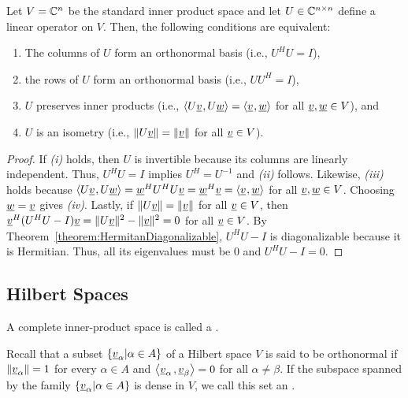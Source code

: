 \begin{theorem}
Let $V = \mathbb{C}^n$ be the standard inner product space and let  $U\in \mathbb{C}^{n\times n}$ define a linear operator on $V$.
Then, the following conditions are equivalent:
\begin{enumerate}
\item[(i)] The columns of $U$ form an orthonormal basis (i.e.,  $U^H U = I$),
\item[(ii)] the rows of $U$ form an orthonormal basis (i.e.,  $U U^H = I$),
\item[(iii)] $U$ preserves inner products (i.e., ${\langle  U \underline{v}  \mskip1mu ,  U \underline{w}  \rangle} = {\langle  \underline{v}  \mskip1mu ,  \underline{w}  \rangle}$ for all $\underline{v},\underline{w}\in V$), and
\item[(iv)] $U$ is an isometry (i.e., $\| U \underline{v} \| = \| \underline{v}\|$ for all $\underline{v} \in V$).
\end{enumerate}
\end{theorem}
\begin{proof}
If {\it(i)} holds, then $U$ is invertible because its columns are linearly independent.
Thus, $U^H U = I$ implies $U^H = U^{-1}$ and {\it(ii)} follows.
Likewise, {\it(iii)} holds because ${\langle  U \underline{v}  \mskip1mu ,  U \underline{w}  \rangle} = \underline{w}^H U^H U \underline{v} = \underline{w}^H \underline{v} = {\langle  \underline{v}  \mskip1mu ,  \underline{w}  \rangle}$ for all $\underline{v},\underline{w}\in V$.
Choosing $\underline{w}=\underline{v}$ gives {\it(iv)}.
Lastly, if $\| U \underline{v} \| = \| \underline{v}\|$ for all $\underline{v} \in V$, then
$\underline{v}^H (U^H U - I) \underline{v} = \| U \underline{v} \|^2 - \| \underline{v} \|^2 = 0$ for all $\underline{v} \in V$.
By Theorem~\ref{theorem:HermitanDiagonalizable}, $U^H U - I$ is diagonalizable because it is Hermitian. Thus, all its eigenvalues must be 0 and $U^H U - I = 0$.
\end{proof}

\subsection{Hilbert Spaces}

\begin{definition}
A complete inner-product space is called a .
\end{definition}

\begin{definition}
Recall that a subset $\left\{ \underline{v}_{\alpha} | \alpha \in A \right\}$ of a Hilbert space $V$ is said to be orthonormal if $\left\| \underline{v}_{\alpha} \right\| = 1$ for every $\alpha \in A$ and ${\left\langle  \underline{v}_{\alpha}  \mskip2mu ,  \underline{v}_{\beta}  \right\rangle} = 0$ for all $\alpha \neq \beta$.
If the subspace spanned by the family $\left\{ \underline{v}_{\alpha} | \alpha \in A \right\}$ is dense in $V$, we call this set an .
\end{definition}

